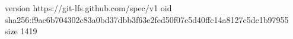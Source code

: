 version https://git-lfs.github.com/spec/v1
oid sha256:f9ac6b704302c83a0bd37dbb3f63e2fed50f07c5d40ffc14a8127c5dc1b97955
size 1419
